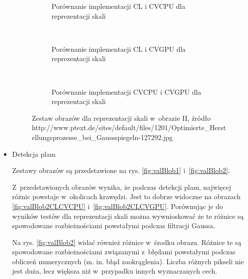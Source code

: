 \begin{itemize}
\begin{figure}[H]
\begin{center}
\begin{subfigure}[t]{0.3\textwidth}
	\centering
	\setlength\fboxsep{0pt}
	\setlength\fboxrule{0.5pt}
	\caption{Porównanie implementacji CL i CVCPU dla reprezentacji skali}
	\label{fig:valPure3CLCVCPU}
\end{subfigure}
~
\begin{subfigure}[t]{0.3\textwidth}
	\centering
	\setlength\fboxsep{0pt}
	\setlength\fboxrule{0.5pt}
	\caption{Porównanie implementacji CL i CVGPU dla reprezentacji skali}
	\label{fig:valPure3CLCVGPU}
\end{subfigure}
~
\begin{subfigure}[t]{0.3\textwidth}
	\centering
	\setlength\fboxsep{0pt}
	\setlength\fboxrule{0.5pt}
	\caption{Porównanie implementacji CVCPU i CVGPU dla reprezentacji skali}
	\label{fig:valPure3CVCPUCVGPU}                 
\end{subfigure}
\end{center}
\caption{Zestaw obrazów dla reprezentacji skali w~obrazie II, \tiny{źródło http://www.ptext.de/sites/default/files/1201/Optimierte\_Herstellungsprozesse\_bei\_Gaussspiegeln-127292.jpg}}

\label{fig:valPure3}
\end{figure}

\newpage

\item{Detekcja plam}
\label{subsubsec:plamyRysunki}

Zestawy obrazów są przedstawione na rys. \ref{fig:valBlob1} i~\ref{fig:valBlob2}. 

Z~przedstawionych obrazów wynika, że podczas detekcji plam, najwięcej różnic powstaje w~okolicach krawędzi. Jest to dobrze widoczne na obrazach \ref{fig:valBlob2CLCVCPU} i~\ref{fig:valBlob2CLCVGPU}. Porównując je do wyników testów dla reprezentacji skali można wywnioskować że te różnice są spowodowane rozbieżnościami powstałymi podczas filtracji Gaussa.

Na rys. \ref{fig:valBlob2} widać również różnice w~środku obrazu. Różnice te są spowodowane rozbieżnościami związanymi z~błędami powstałymi podczas obliczeń numerycznych (m. in. błąd zaokrąglenia). Liczba różnych pikseli nie jest duża, lecz większa niż w~przypadku innych wyznaczanych cech.


\end{itemize}
